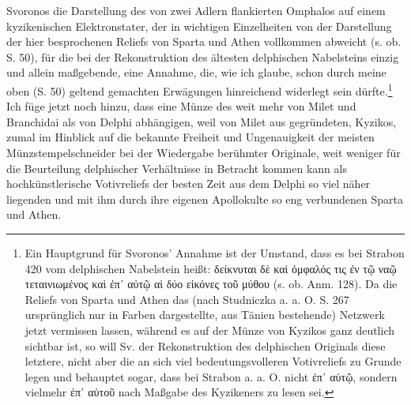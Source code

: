 \documentclass[a4paper, 11pt, oneside]{article}
\begin{document}
Svoronos die Darstellung des von zwei Adlern flankierten Omphalos auf einem kyzikenischen Elektronstater, der in wichtigen Einzelheiten von der Darstellung der hier besprochenen Reliefs von Sparta und Athen vollkommen abweicht (s. ob. S. 50), für die bei der Rekonstruktion des ältesten delphischen Nabelsteins einzig und allein maßgebende, eine Annahme, die, wie ich glaube, schon durch meine oben (S. 50) geltend gemachten Erwägungen hinreichend widerlegt sein dürfte.\footnote{Ein Hauptgrund für Svoronos' Annahme ist der Umstand, dass es bei Strabon 420 vom delphischen Nabelstein heißt: δείκνυται δὲ καὶ ὀμφαλός τις ἐν τῷ ναῷ τεταινιωμένος καὶ ἐπ᾿ αὐτῷ αἱ δύο εἰκόνες τοῦ μύθου (s. ob. Anm. 128). Da die Reliefs von Sparta und Athen das (nach Studniczka a. a. O. S. 267 ursprünglich nur in Farben dargestellte, aus Tänien bestehende) Netzwerk jetzt vermissen lassen, während es auf der Münze von Kyzikos ganz deutlich sichtbar ist, so will Sv. der Rekonstruktion des delphischen Originals diese letztere, nicht aber die an sich viel bedeutungsvolleren Votivreliefs zu Grunde legen und behauptet sogar, dass bei Strabon a. a. O. nicht ἐπ᾽ αὐτῷ, sondern vielmehr ἐπ᾽ αὐτοῦ nach Maßgabe des Kyzikeners zu lesen sei.} Ich füge jetzt noch hinzu, dass eine Münze des weit mehr von Milet und Branchidai als von Delphi abhängigen, weil von Milet aus gegründeten, Kyzikos, zumal im Hinblick auf die bekannte Freiheit und Ungenauigkeit der meisten Münzstempelschneider bei der Wiedergabe berühmter Originale, weit weniger für die Beurteilung delphischer Verhältnisse in Betracht kommen kann als hochkünstlerische Votivreliefs der besten Zeit aus dem Delphi so viel näher liegenden und mit ihm durch ihre eigenen Apollokulte so eng verbundenen Sparta und Athen.
\end{document}
